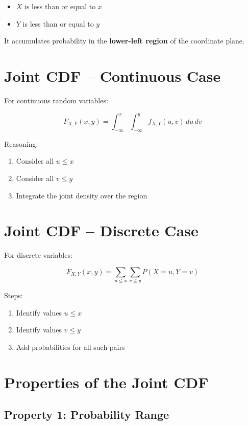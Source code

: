 \documentclass[12pt]{article}
\begin{document}
\begin{itemize}
\item $X$ is less than or equal to $x$
\item $Y$ is less than or equal to $y$
\end{itemize}

It accumulates probability in the \textbf{lower-left region} of the coordinate plane.

\section{Joint CDF -- Continuous Case}

For continuous random variables:

\[
F_{X,Y}(x,y) =
\int_{-\infty}^{x}
\int_{-\infty}^{y}
f_{X,Y}(u,v)\,du\,dv
\]

Reasoning:

\begin{enumerate}
\item Consider all $u \le x$
\item Consider all $v \le y$
\item Integrate the joint density over the region
\end{enumerate}

\section{Joint CDF -- Discrete Case}

For discrete variables:

\[
F_{X,Y}(x,y) =
\sum_{u\le x}
\sum_{v\le y}
P(X=u,Y=v)
\]

Steps:

\begin{enumerate}
\item Identify values $u \le x$
\item Identify values $v \le y$
\item Add probabilities for all such pairs
\end{enumerate}

\section{Properties of the Joint CDF}

\subsection{Property 1: Probability Range}
\end{document}

